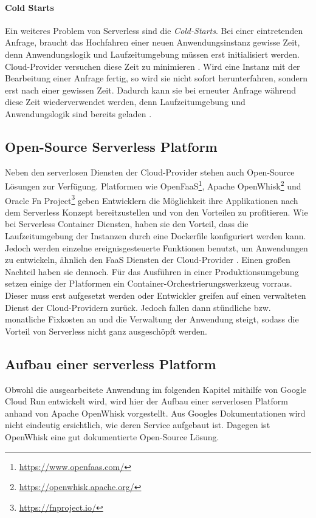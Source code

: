 \paragraph{Cold Starts} Ein weiteres Problem von Serverless sind die \emph{Cold-Starts}.
Bei einer eintretenden Anfrage, braucht das Hochfahren einer neuen Anwendungsinstanz
gewisse Zeit, denn Anwendungslogik und Laufzeitumgebung müssen erst initialisiert werden.
Cloud-Provider versuchen diese Zeit zu minimieren \cite{Firecracker}. Wird eine Instanz mit der Bearbeitung einer Anfrage
fertig, so wird sie nicht sofort herunterfahren, sondern erst nach einer gewissen Zeit.
Dadurch kann sie bei erneuter Anfrage während diese Zeit wiederverwendet werden, denn Laufzeitumgebung und
Anwendungslogik sind bereits geladen \cite{ColdStartComp}.

\subsection{Open-Source Serverless Platform}

Neben den serverlosen Diensten der Cloud-Provider stehen
auch Open-Source Lösungen zur Verfügung. Platformen wie
OpenFaaS\footnote{\url{https://www.openfaas.com/}},
Apache OpenWhisk\footnote{\url{https://openwhisk.apache.org/}} und
Oracle Fn Project\footnote{\url{https://fnproject.io/}} geben
Entwicklern die Möglichkeit ihre Applikationen
nach dem Serverless Konzept bereitzustellen und
von den Vorteilen zu profitieren. Wie bei Serverless
Container Diensten, haben sie den Vorteil,
dass die Laufzeitumgebung der Instanzen durch
eine Dockerfile konfiguriert werden kann.
Jedoch werden einzelne ereignisgesteuerte Funktionen benutzt,
um Anwendungen zu entwickeln, ähnlich den FaaS Diensten der
Cloud-Provider \cite{OpenFaasGithub} \cite{OpenWhiskGithub}.
Einen großen Nachteil haben sie dennoch.
Für das Ausführen in einer Produktionsumgebung setzen einige
der Platformen ein Container-Orchestrierungswerkzeug vorraus.
Dieser muss erst aufgesetzt werden oder Entwickler greifen auf
einen verwalteten Dienst der Cloud-Providern zurück. Jedoch fallen
dann stündliche bzw. monatliche Fixkosten an und die
Verwaltung der Anwendung steigt, sodass die Vorteil
von Serverless nicht ganz ausgeschöpft werden.

\subsection{Aufbau einer serverless Platform}
Obwohl die ausgearbeitete Anwendung im folgenden Kapitel
mithilfe von Google Cloud Run entwickelt wird,
wird hier der Aufbau einer serverlosen Platform
anhand von Apache OpenWhisk vorgestellt.
Aus Googles Dokumentationen wird nicht eindeutig ersichtlich, wie
deren Service aufgebaut ist. Dagegen ist OpenWhisk eine
gut dokumentierte Open-Source Lösung.

